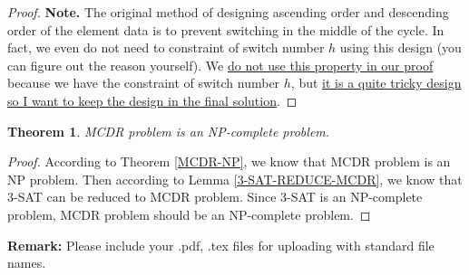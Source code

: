\documentclass[12pt,a4paper]{article}
\newtheorem{theorem}{Theorem}
\theoremstyle{definition}
\begin{document}
\begin{enumerate}
\begin{proof}
    {\color{purple}\textbf{Note.} The original method of designing ascending order and descending order of the element data is to prevent switching in the middle of the cycle. In fact, we even do not need to constraint of switch number $h$ using this design (you can figure out the reason yourself). We \underline{do not use this property in our proof} because we have the constraint of switch number $h$, but \underline{it is a quite tricky design so I want to keep the design in the final solution}.}
    \end{proof}
    
    \begin{theorem}\label{MCDR-NPC}
    \emph{MCDR} problem is an NP-complete problem.
    \end{theorem} 
    \begin{proof}
    According to Theorem \ref{MCDR-NP}, we know that MCDR problem is an NP problem. Then according to Lemma \ref{3-SAT-REDUCE-MCDR}, we know that 3-SAT can be reduced to MCDR problem. Since 3-SAT is an NP-complete problem, MCDR problem should be an NP-complete problem.
    \end{proof}
    
\end{enumerate}

\textbf{Remark:} Please include your .pdf, .tex files for uploading with standard file names.




\end{document}
